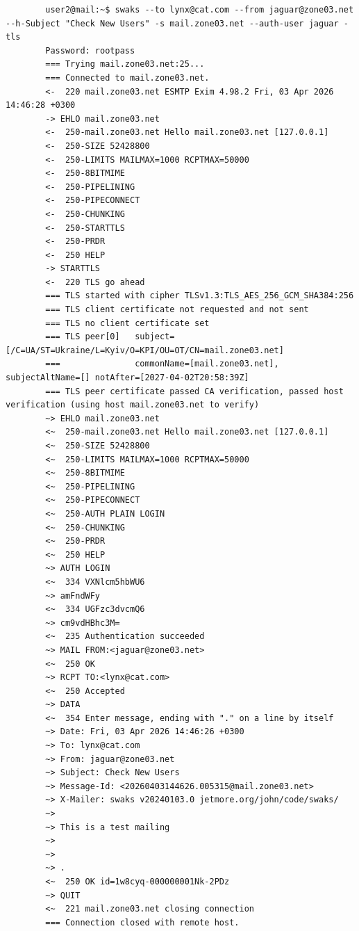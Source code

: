 \documentclass[14pt, a4paper]{extreport}
\begin{document}
	\begin{verbatim}
		user2@mail:~$ swaks --to lynx@cat.com --from jaguar@zone03.net --h-Subject "Check New Users" -s mail.zone03.net --auth-user jaguar -tls
		Password: rootpass
		=== Trying mail.zone03.net:25...
		=== Connected to mail.zone03.net.
		<-  220 mail.zone03.net ESMTP Exim 4.98.2 Fri, 03 Apr 2026 14:46:28 +0300
		-> EHLO mail.zone03.net
		<-  250-mail.zone03.net Hello mail.zone03.net [127.0.0.1]
		<-  250-SIZE 52428800
		<-  250-LIMITS MAILMAX=1000 RCPTMAX=50000
		<-  250-8BITMIME
		<-  250-PIPELINING
		<-  250-PIPECONNECT
		<-  250-CHUNKING
		<-  250-STARTTLS
		<-  250-PRDR
		<-  250 HELP
		-> STARTTLS
		<-  220 TLS go ahead
		=== TLS started with cipher TLSv1.3:TLS_AES_256_GCM_SHA384:256
		=== TLS client certificate not requested and not sent
		=== TLS no client certificate set
		=== TLS peer[0]   subject=[/C=UA/ST=Ukraine/L=Kyiv/O=KPI/OU=OT/CN=mail.zone03.net]
		===               commonName=[mail.zone03.net], subjectAltName=[] notAfter=[2027-04-02T20:58:39Z]
		=== TLS peer certificate passed CA verification, passed host verification (using host mail.zone03.net to verify)
		~> EHLO mail.zone03.net
		<~  250-mail.zone03.net Hello mail.zone03.net [127.0.0.1]
		<~  250-SIZE 52428800
		<~  250-LIMITS MAILMAX=1000 RCPTMAX=50000
		<~  250-8BITMIME
		<~  250-PIPELINING
		<~  250-PIPECONNECT
		<~  250-AUTH PLAIN LOGIN
		<~  250-CHUNKING
		<~  250-PRDR
		<~  250 HELP
		~> AUTH LOGIN
		<~  334 VXNlcm5hbWU6
		~> amFndWFy
		<~  334 UGFzc3dvcmQ6
		~> cm9vdHBhc3M=
		<~  235 Authentication succeeded
		~> MAIL FROM:<jaguar@zone03.net>
		<~  250 OK
		~> RCPT TO:<lynx@cat.com>
		<~  250 Accepted
		~> DATA
		<~  354 Enter message, ending with "." on a line by itself
		~> Date: Fri, 03 Apr 2026 14:46:26 +0300
		~> To: lynx@cat.com
		~> From: jaguar@zone03.net
		~> Subject: Check New Users
		~> Message-Id: <20260403144626.005315@mail.zone03.net>
		~> X-Mailer: swaks v20240103.0 jetmore.org/john/code/swaks/
		~> 
		~> This is a test mailing
		~> 
		~> 
		~> .
		<~  250 OK id=1w8cyq-000000001Nk-2PDz
		~> QUIT
		<~  221 mail.zone03.net closing connection
		=== Connection closed with remote host.
		

\end{verbatim}
\end{document}
